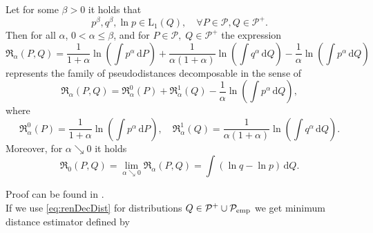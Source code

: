 \begin{theorem}\label{theo:renMDE}
Let for some $\beta>0$ it holds that
	\begin{equation}
			p^\beta, q^\beta,\ln{p} \in \mathrm{L}_1(Q), \quad \forall P \in \mathcal{P}, Q \in \mathcal{P^+}.
			\label{eq:betaCond}
	\end{equation}
	Then for all $\alpha$, $0 < \alpha \leq \beta$, and for $P \in \mathcal{P}, \; Q \in \mathcal{P^+} $ the expression
	\begin{equation}
		\mathfrak{R}_\alpha (P,Q) = \dfrac{1}{1+\alpha}\ln{\left( \int{p^\alpha \,\mathrm{d}P } \right)} +
		\dfrac{1}{\alpha (1+\alpha)}\ln{\left( \int{q^\alpha \,\mathrm{d}Q } \right)} -
		\dfrac{1}{\alpha} \ln{\left( \int{p^\alpha \,\mathrm{d}Q } \right)}
		\label{eq:renDecDist}
	\end{equation}
		represents the family of pseudodistances decomposable in the sense of
	\begin{equation*}
		\mathfrak{R}_\alpha (P,Q) = \mathfrak{R}_\alpha^0 (P) + \mathfrak{R}_\alpha^1 (Q) - \dfrac{1}{\alpha} \ln{\left( \int{p^\alpha \,\mathrm{d}Q } \right)},
	\end{equation*}	
	where
	\begin{equation*}
		\mathfrak{R}_\alpha^0 (P) = \dfrac{1}{1+\alpha}\ln{\left( \int{p^\alpha \,\mathrm{d}P } \right)}, \quad \mathfrak{R}_\alpha^1 (Q) = \dfrac{1}{\alpha (1+\alpha)}\ln{\left( \int{q^\alpha \,\mathrm{d}Q } \right)}.
	\end{equation*}
	Moreover, for $\alpha \searrow 0$ it holds
	\begin{equation*}
		\mathfrak{R}_0 (P,Q) = \lim_{\alpha \searrow 0} \mathfrak{R}_\alpha (P,Q) =  \int{\left( \ln{q} - \ln{p} \right)\,\mathrm{d}Q}.
	\end{equation*}
\end{theorem}
\noindent Proof can be found in \cite{Decomposable2011}. \\
If we use \ref{eq:renDecDist} for distributions $Q \in \mathcal{P}^+ \cup \mathcal{P}_\mathrm{emp}$ we get minimum \ren distance estimator defined by

